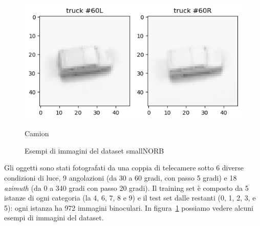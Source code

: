 \documentclass[italian,12pt,a4paper,oneside,final]{report}
\begin{document}
\begin{figure}[!ht]
{\begin{subcaptionblock}{0.4\textwidth}
			\centering
			\includegraphics[width=1\linewidth]{smallnorb_truck.png}
			\caption{Camion}
			\label{fig:smallnorb_truck}
		\end{subcaptionblock}%
	}
	\caption{Esempi di immagini del dataset smallNORB}
	\label{fig:smallnorb_samples}
\end{figure}

\noindent Gli oggetti sono stati fotografati da una coppia di telecamere sotto 6 diverse condizioni di luce, 9 angolazioni (da 30 a 60 gradi, con passo 5 gradi) e 18 \textit{azimuth} (da 0 a 340 gradi con passo 20 gradi).
Il training set è composto da 5 istanze di ogni categoria (la 4, 6, 7, 8 e 9) e il test set dalle restanti (0, 1, 2, 3, e 5): ogni istanza ha 972 immagini binoculari.
In figura~\ref{fig:smallnorb_samples} possiamo vedere alcuni esempi di immagini del dataset.
\end{document}
